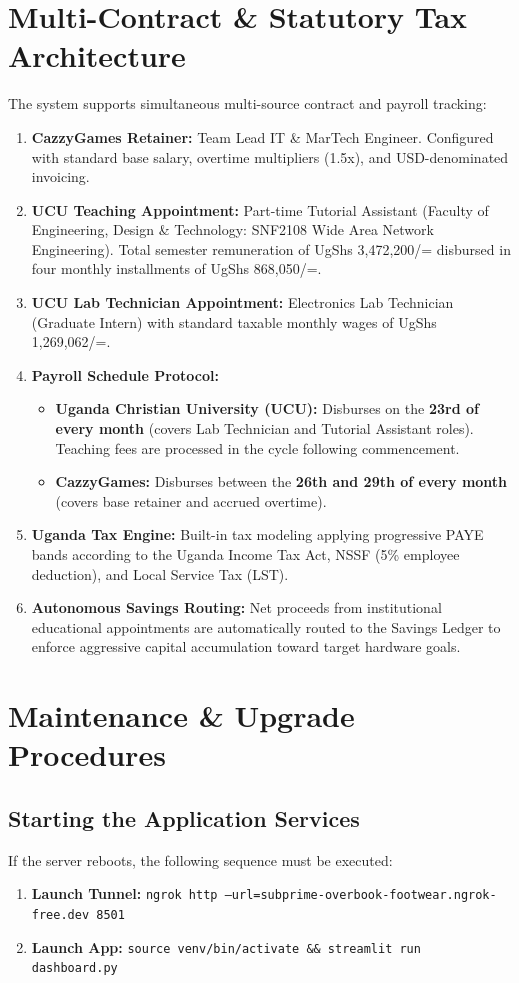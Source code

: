 \documentclass[12pt,a4paper]{article}
\begin{document}
\section{Multi-Contract \& Statutory Tax Architecture}
The system supports simultaneous multi-source contract and payroll tracking:
\begin{enumerate}
    \item \textbf{CazzyGames Retainer:} Team Lead IT \& MarTech Engineer. Configured with standard base salary, overtime multipliers (1.5x), and USD-denominated invoicing.
    \item \textbf{UCU Teaching Appointment:} Part-time Tutorial Assistant (Faculty of Engineering, Design \& Technology: SNF2108 Wide Area Network Engineering). Total semester remuneration of UgShs 3,472,200/= disbursed in four monthly installments of UgShs 868,050/=.
    \item \textbf{UCU Lab Technician Appointment:} Electronics Lab Technician (Graduate Intern) with standard taxable monthly wages of UgShs 1,269,062/=.
    \item \textbf{Payroll Schedule Protocol:}
    \begin{itemize}
        \item \textbf{Uganda Christian University (UCU):} Disburses on the \textbf{23rd of every month} (covers Lab Technician and Tutorial Assistant roles). Teaching fees are processed in the cycle following commencement.
        \item \textbf{CazzyGames:} Disburses between the \textbf{26th and 29th of every month} (covers base retainer and accrued overtime).
    \end{itemize}
    \item \textbf{Uganda Tax Engine:} Built-in tax modeling applying progressive PAYE bands according to the Uganda Income Tax Act, NSSF (5\% employee deduction), and Local Service Tax (LST).
    \item \textbf{Autonomous Savings Routing:} Net proceeds from institutional educational appointments are automatically routed to the Savings Ledger to enforce aggressive capital accumulation toward target hardware goals.
\end{enumerate}

\section{Maintenance \& Upgrade Procedures}

\subsection{Starting the Application Services}
If the server reboots, the following sequence must be executed:
\begin{enumerate}
    \item \textbf{Launch Tunnel:} \texttt{ngrok http --url=subprime-overbook-footwear.ngrok-free.dev 8501}
    \item \textbf{Launch App:} \texttt{source venv/bin/activate \&\& streamlit run dashboard.py}
\end{enumerate}
\end{document}
